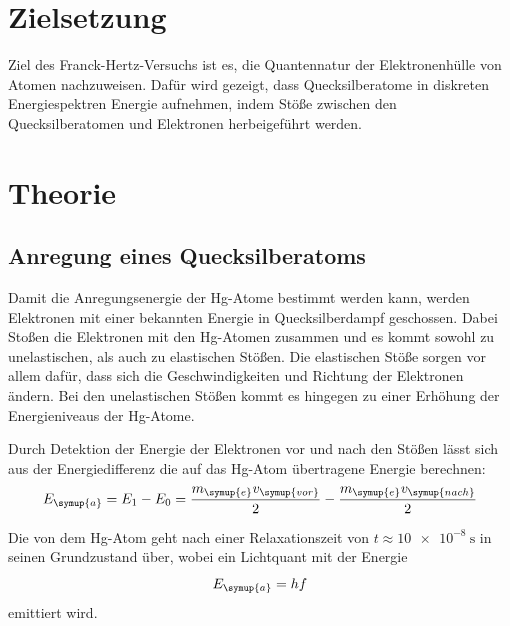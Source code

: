 \section{Zielsetzung}
Ziel des Franck-Hertz-Versuchs ist es, die Quantennatur der Elektronenhülle von Atomen nachzuweisen. Dafür wird gezeigt, dass 
Quecksilberatome in diskreten Energiespektren Energie aufnehmen, indem Stöße zwischen den Quecksilberatomen und Elektronen 
herbeigeführt werden.

\section{Theorie}
\label{sec:Theorie}
\subsection{Anregung eines Quecksilberatoms}
\label{sec:Anregung}
Damit die Anregungsenergie der Hg-Atome bestimmt werden kann, werden Elektronen mit einer bekannten Energie in Quecksilberdampf 
geschossen. Dabei Stoßen die Elektronen mit den Hg-Atomen zusammen und es kommt sowohl zu unelastischen, als auch zu elastischen 
Stößen.
Die elastischen Stöße sorgen vor allem dafür, dass sich die Geschwindigkeiten und Richtung der Elektronen ändern. Bei den unelastischen
Stößen kommt es hingegen zu einer Erhöhung der Energieniveaus der Hg-Atome.

Durch Detektion der Energie der Elektronen vor und nach den Stößen lässt sich aus der Energiedifferenz die auf das Hg-Atom übertragene
Energie berechnen:
\begin{equation}
    E_{\symup{a}} = E_1-E_0 = \frac{m_{\symup{e}}v_{\symup{vor}}}{2}-\frac{m_{\symup{e}}v_{\symup{nach}}}{2}
    \label{eq:Anregungsenergie}
\end{equation}

Die von dem Hg-Atom geht nach einer Relaxationszeit von $t\approx\qty{10e-8}{\second}$ in seinen Grundzustand über,
wobei ein Lichtquant mit der Energie
\begin{equation*}
    E_{\symup{a}} = hf
\end{equation*}
emittiert wird.

